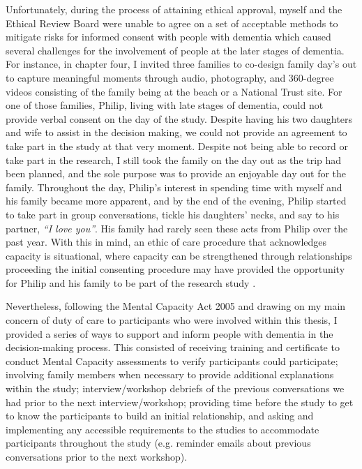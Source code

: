 Unfortunately, during the process of attaining ethical approval, myself and the Ethical Review Board were unable to agree on a set of acceptable methods to mitigate risks for informed consent with people with dementia which caused several challenges for the involvement of people at the later stages of dementia. For instance, in chapter four, I invited three families to co-design family day's out to capture meaningful moments through audio, photography, and 360-degree videos consisting of the family being at the beach or a National Trust site. For one of those families, Philip, living with late stages of dementia, could not provide verbal consent on the day of the study. Despite having his two daughters and wife to assist in the decision making, we could not provide an agreement to take part in the study at that very moment. 
Despite not being able to record or take part in the research, I still took the family on the day out as the trip had been planned, and the sole purpose was to provide an enjoyable day out for the family. Throughout the day, Philip's interest in spending time with myself and his family became more apparent, and by the end of the evening, Philip started to take part in group conversations, tickle his daughters' necks, and say to his partner, \textit{``I love you''}. His family had rarely seen these acts from Philip over the past year. With this in mind, an ethic of care procedure that acknowledges capacity is situational, where capacity can be strengthened through relationships proceeding the initial consenting procedure may have provided the opportunity for Philip and his family to be part of the research study \citep{lloyd2004mortality}.

Nevertheless, following the Mental Capacity Act 2005 \citep{oyebode_mental_2005} and drawing on my main concern of duty of care to participants who were involved within this thesis, I provided a series of ways to support and inform people with dementia in the decision-making process. This consisted of receiving training and certificate to conduct Mental Capacity assessments to verify participants could participate; involving family members when necessary to provide additional explanations within the study; interview/workshop debriefs of the previous conversations we had prior to the next interview/workshop; providing time before the study to get to know the participants to build an initial relationship, and asking and implementing any accessible requirements to the studies to accommodate participants throughout the study (e.g. reminder emails about previous conversations prior to the next workshop). 

